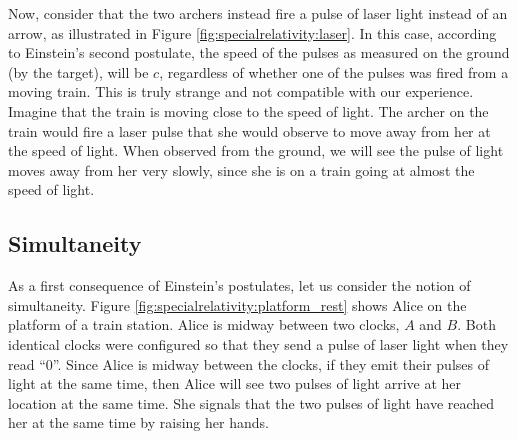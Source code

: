 Now, consider that the two archers instead fire a pulse of laser light instead of an arrow, as illustrated in Figure \ref{fig:specialrelativity:laser}. 
In this case, according to Einstein's second postulate, the speed of the pulses as measured on the ground (by the target), will be $c$, regardless of whether one of the pulses was fired from a moving train. This is truly strange and not compatible with our experience. Imagine that the train is moving close to the speed of light. The archer on the train would fire a laser pulse that she would observe to move away from her at the speed of light. When observed from the ground, we will see the pulse of light moves away from her very slowly, since she is on a train going at almost the speed of light. 

\subsection{Simultaneity}
As a first consequence of Einstein's postulates, let us consider the notion of simultaneity. Figure \ref{fig:specialrelativity:platform_rest} shows Alice on the platform of a train station. Alice is midway between two clocks, $A$ and $B$. Both identical clocks were configured so that they send a pulse of laser light when they read ``0''. Since Alice is midway between the clocks, if they emit their pulses of light at the same time, then Alice will see two pulses of light arrive at her location at the same time. She signals that the two pulses of light have reached her at the same time by raising her hands. 


